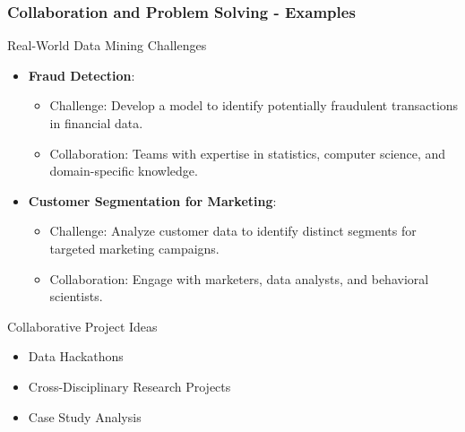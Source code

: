 \documentclass{beamer}
\begin{document}
\begin{frame}[fragile]
    \frametitle{Collaboration and Problem Solving - Examples}
    \begin{block}{Real-World Data Mining Challenges}
        \begin{itemize}
            \item \textbf{Fraud Detection}:
                \begin{itemize}
                    \item Challenge: Develop a model to identify potentially fraudulent transactions in financial data.
                    \item Collaboration: Teams with expertise in statistics, computer science, and domain-specific knowledge.
                \end{itemize}
            \item \textbf{Customer Segmentation for Marketing}:
                \begin{itemize}
                    \item Challenge: Analyze customer data to identify distinct segments for targeted marketing campaigns.
                    \item Collaboration: Engage with marketers, data analysts, and behavioral scientists.
                \end{itemize}
        \end{itemize}
    \end{block}

    \begin{block}{Collaborative Project Ideas}
        \begin{itemize}
            \item Data Hackathons
            \item Cross-Disciplinary Research Projects
            \item Case Study Analysis
        \end{itemize}
    \end{block}
\end{frame}
\end{document}
